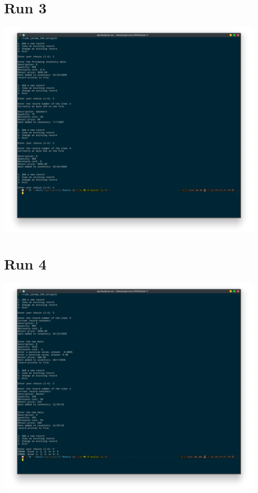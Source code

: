 \documentclass[letterpaper, 11pt]{article}
\begin{document}
\section*{Run 3}
\includegraphics[scale=0.5]{run3.png}

\section*{Run 4}
\includegraphics[scale=0.5]{run4.png}
\end{document}
